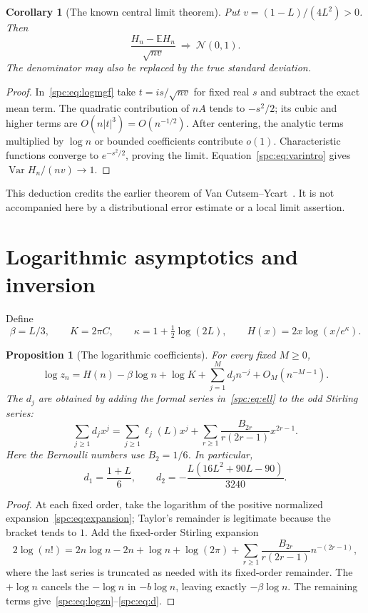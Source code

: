 \documentclass[11pt,letterpaper]{article}
\newtheorem{proposition}[theorem]{Proposition}
\newtheorem{corollary}[theorem]{Corollary}
\theoremstyle{definition}\newtheorem{definition}[theorem]{Definition}
\theoremstyle{remark}\newtheorem{remark}[theorem]{Remark}
\newcommand{\E}{\mathbb E}
\newcommand{\Var}{\operatorname{Var}}
\begin{document}
\begin{corollary}[The known central limit theorem]\label{spc:cor:clt}
Put $v=(1-L)/(4L^2)>0$. Then
\[
 \frac{H_n-\E H_n}{\sqrt{nv}}\ \Longrightarrow\ \mathcal N(0,1).
\]
The denominator may also be replaced by the true standard deviation.
\end{corollary}
\begin{proof}
In~\eqref{spc:eq:logmgf} take $t=is/\sqrt{nv}$ for fixed real $s$ and subtract the exact mean term. The quadratic contribution of $nA$ tends to $-s^2/2$; its cubic and higher terms are $O(n|t|^3)=O(n^{-1/2})$. After centering, the analytic terms multiplied by $\log n$ or bounded coefficients contribute $o(1)$. Characteristic functions converge to $e^{-s^2/2}$, proving the limit. Equation~\eqref{spc:eq:varintro} gives $\Var H_n/(nv)\to1$.
\end{proof}
This deduction credits the earlier theorem of Van Cutsem--Ycart~\cite{VanCutsemYcart}. It is not accompanied here by a distributional error estimate or a local limit assertion.

\section{Logarithmic asymptotics and inversion}\label{spc:sec:inverse}
Define
\[
 \beta=L/3,\qquad K=2\pi C,\qquad
 \kappa=1+\tfrac12\log(2L),\qquad H(x)=2x\log(x/e^\kappa).
\]
\begin{proposition}[The logarithmic coefficients]\label{spc:prop:log}
For every fixed $M\ge0$,
\begin{equation}\label{spc:eq:logzn}
 \log z_n=H(n)-\beta\log n+\log K+
          \sum_{j=1}^Md_jn^{-j}+O_M(n^{-M-1}).
\end{equation}
The $d_j$ are obtained by adding the formal series in~\eqref{spc:eq:ell} to the odd Stirling series:
\begin{equation}\label{spc:eq:d}
 \sum_{j\ge1}d_jx^j
 =\sum_{j\ge1}\ell_j(L)x^j+
   \sum_{r\ge1}\frac{B_{2r}}{r(2r-1)}x^{2r-1}.
\end{equation}
Here the Bernoulli numbers use $B_2=1/6$. In particular,
\[
 d_1=\frac{1+L}{6},\qquad
 d_2=-\frac{L(16L^2+90L-90)}{3240}.
\]
\end{proposition}
\begin{proof}
At each fixed order, take the logarithm of the positive normalized expansion~\eqref{spc:eq:expansion}; Taylor's remainder is legitimate because the bracket tends to $1$. Add the fixed-order Stirling expansion
\[
 2\log(n!)=2n\log n-2n+\log n+\log(2\pi)
 +\sum_{r\ge1}\frac{B_{2r}}{r(2r-1)}n^{-(2r-1)},
\]
where the last series is truncated as needed with its fixed-order remainder. The $+\log n$ cancels the $-\log n$ in $-b\log n$, leaving exactly $-\beta\log n$. The remaining terms give~\eqref{spc:eq:logzn}--\eqref{spc:eq:d}.
\end{proof}
\end{document}
